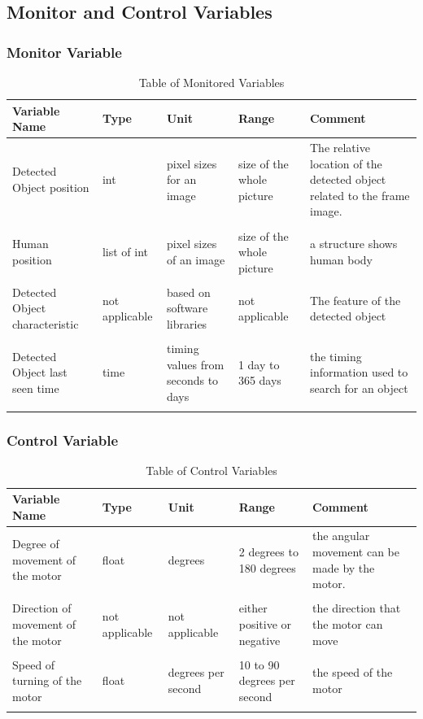 \documentclass[12pt]{article}
\begin{document}
\subsection{Monitor and Control Variables}
\subsubsection{Monitor Variable}

\begin{table}[H]
\caption{Table of Monitored Variables} 
\begin{tabularx}{\textwidth}{XXXXX}
\toprule
\textbf{Variable Name} & \textbf{Type} & \textbf{Unit} & \textbf{Range} & \textbf{Comment} \\
\midrule
Detected Object position & int & pixel sizes for an image & size of the whole picture & The relative location of the detected object related to the frame image.\\\\
Human position & list of int & pixel sizes of an image & size of the whole picture & a structure shows human body\\\\
Detected Object characteristic & not applicable &  based on software libraries & not applicable & The feature of the detected object\\\\
Detected Object last seen time & time & timing values from seconds to days & 1 day to 365 days & the timing information used to search for an object\\\\
\bottomrule
\end{tabularx}
\end{table}

\subsubsection{Control Variable}

\begin{table}[H]
\caption{Table of Control Variables} 
\begin{tabularx}{\textwidth}{XXXXX}
\toprule
\textbf{Variable Name} & \textbf{Type} & \textbf{Unit} & \textbf{Range} & \textbf{Comment} \\
\midrule
Degree of movement of the motor & float & degrees & 2 degrees to 180 degrees & the angular movement can be made by the motor.\\\\
Direction of movement of the motor & not applicable & not applicable & either positive or negative & the direction that the motor can move\\\\
Speed of turning of the motor &  float & degrees per second & 10 to 90 degrees per second & the speed of the motor\\\\
\bottomrule
\end{tabularx}
\end{table}
\end{document}
